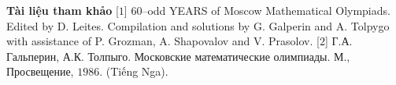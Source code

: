 \begin{multicols}{2}
	\textbf{\color{cackithi}Tài liệu tham khảo}
	\vskip 0.1cm
	[$1$] $60$--odd YEARS of Moscow Mathematical Olympiads. Edited by D. Leites. Compilation and solutions by G. Galperin and A. Tolpygo with assistance of P. Grozman, A. Shapovalov and V. Prasolov.
	\vskip 0.1cm
	[$2$] Г.А. Гальперин, А.К. Толпыго. Московские математические олимпиады. М., Просвещение, $1986$. (Tiếng Nga). 
\end{multicols}
\newpage
\begingroup
{}
\centering
\endgroup
\vspace*{5pt}

